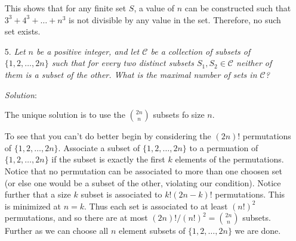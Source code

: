 \documentclass{article}
\begin{document}
\begin{enumerate}
This shows that for any finite set $S$, a value of $n$ can be constructed such that $3^3 + 4^3 + \dots + n^3$ is not divisible by any value in the set.
Therefore, no such set exists.


\item[5.] %
\textit{\newcommand{\CC}{\mathcal{C}}
Let $n$ be a positive integer, and let $\CC$ be a collection of subsets of $\{1, 2, \dotsc, 2n\}$ such that for every two distinct subsets $S_1, S_2 \in \CC$ neither of them is a subset of the other.
What is the maximal number of sets in $\CC$?}

\textit{Solution}:

The unique solution is to use the ${2n}\choose n$ subsets fo size $n$.

To see that you can't do better begin by considering the $(2n)!$ permutations of $\{1, 2, \dotsc, 2n\}$. Associate a subset of $\{1, 2, \dotsc, 2n\}$ to a permuation of $\{1, 2, \dotsc, 2n\}$ if the subset is exactly the first $k$ elements of the permutations. Notice that no permutation can be associated to more than one choosen set (or else one would be a subset of the other, violating our condition). Notice further that a size $k$ subset is associated to $k!(2n-k)!$ permutations. This is minimized at $n=k$. Thus each set is associated to at least $(n!)^2$ permutations, and so there are at most $(2n)! / (n!)^2 = \binom{2n}{n}$ subsets. Further as we can choose all $n$ element subsets of $\{1, 2, \dotsc, 2n\}$ we are done. 
\end{enumerate}
\end{document}
